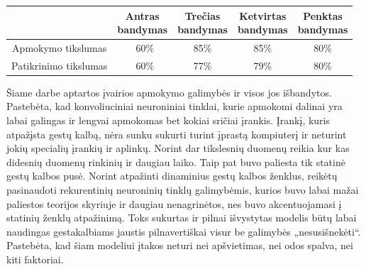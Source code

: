 \documentclass{VUMIFInfKursinis}
\begin{document}
\begin{minipage}{\linewidth}
	\centering
	 \label{tab:title} 
	\begin{tabular}{ |c|c|c|c|c| } 
		\hline
		 & \thead{Antras\\bandymas} & \thead{Trečias\\bandymas} & \thead{Ketvirtas\\bandymas} & \thead{Penktas\\bandymas} \\
		\hline
		Apmokymo tikslumas & ~60\% & 85\% & 85\% & 80\% \\ 
		Patikrinimo tikslumas & ~60\% & 77\% & 79\% & 80\% \\ 
		\hline
	\end{tabular}
\end{minipage}


Šiame darbe aptartos įvairios apmokymo galimybės ir visos jos išbandytos. Pastebėta, kad konvoliuciniai neuroniniai tinklai, kurie apmokomi dalinai yra labai galingas ir lengvai apmokomas bet kokiai sričiai įrankis. Įrankį, kuris atpažįsta gestų kalbą, nėra sunku sukurti turint įprastą kompiuterį ir neturint jokių specialių įrankių ir aplinkų. Norint dar tikslesnių duomenų reikia kur kas didesnių duomenų rinkinių ir daugiau laiko. Taip pat buvo paliesta tik statinė gestų kalbos pusė. Norint atpažinti dinaminius gestų kalbos ženklus, reikėtų pasinaudoti rekurentinių neuroninių tinklų galimybėmis, kurios buvo labai mažai paliestos teorijos skyriuje ir daugiau nenagrinėtos, nes buvo akcentuojamasi į statinių ženklų atpažinimą. Toks sukurtas ir pilnai išvystytas modelis būtų labai naudingas gestakalbiams jaustis pilnavertiškai visur be galimybės „nesusišnekėti“. Pastebėta, kad šiam modeliui įtakos neturi nei apšvietimas, nei odos spalva, nei kiti faktoriai. 

\printbibliography[heading=bibintoc] %

\appendix  %
\end{document}
